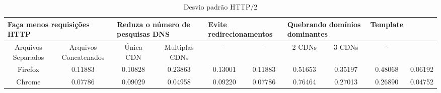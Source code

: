 \begin{table}[h]
	\centering
	\caption{Desvio padrão HTTP/2}
	\label{desviopadraohttp2}
	\begin{tabular}{cccccccccc}
		\hline
        \multicolumn{2}{l}{\textbf{Faça menos requisições HTTP}} & \multicolumn{2}{l}{\textbf{Reduza o número de pesquisas DNS}} & \multicolumn{2}{l}{\textbf{Evite redirecionamentos}} & \multicolumn{2}{l}{\textbf{Quebrando domínios dominantes}} & \textbf{Template} \\
		\hline
        Arquivos Separados & Arquivos Concatenados & Única CDN & Multiplas CDNs & - & - & 2 CDNs & 3 CDNs & - \\
		Firefox & 0.11883 & 0.10828 & 0.23863 & 0.13001 & 0.11883 & 0.51653 & 0.35197 & 0.48068 & 0.06192  \\
		Chrome & 0.07786 & 0.09029 & 0.04958 & 0.09220 & 0.07786 & 0.76464 & 0.27013 & 0.26890 & 0.04752  \\
		\hline
	\end{tabular}
\end{table}